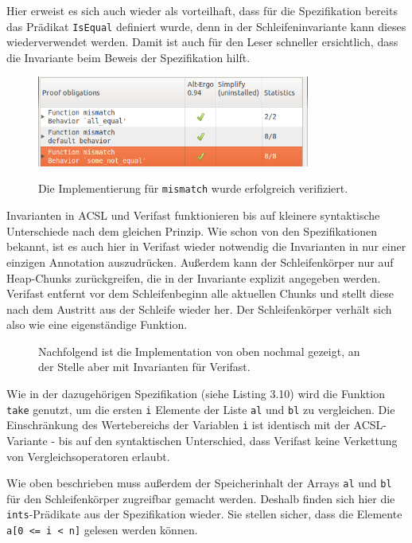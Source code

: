 Hier erweist es sich auch wieder als vorteilhaft, dass für die Spezifikation bereits das Prädikat
\lstinline{IsEqual} definiert wurde, denn in der Schleifeninvariante kann dieses wiederverwendet werden. Damit
ist auch für den Leser schneller ersichtlich, dass die Invariante beim Beweis der Spezifikation hilft.

\begin{figure}[H]
	\centering
\includegraphics[width=0.8\textwidth]{images/acsl-prove-mismatch.png}

Die Implementierung für \lstinline{mismatch} wurde erfolgreich verifiziert.
\end{figure}

Invarianten in ACSL und Verifast funktionieren bis auf kleinere syntaktische Unterschiede nach dem gleichen Prinzip.
Wie schon von den Spezifikationen bekannt, ist es auch hier in Verifast wieder notwendig die Invarianten in nur
einer einzigen Annotation auszudrücken. Außerdem kann der Schleifenkörper nur auf Heap-Chunks zurückgreifen, die
in der Invariante explizit angegeben werden. Verifast entfernt vor dem Schleifenbeginn alle aktuellen Chunks
und stellt diese nach dem Austritt aus der Schleife wieder her. Der Schleifenkörper verhält sich also
wie eine eigenständige Funktion.

\begin{figure}[H]
Nachfolgend ist die Implementation von oben nochmal gezeigt, an der Stelle aber mit Invarianten für Verifast.


\end{figure} 

Wie in der dazugehörigen Spezifikation (siehe Listing 3.10) wird die Funktion \lstinline{take} genutzt,
um die ersten \lstinline{i} Elemente der Liste \lstinline{al} und \lstinline{bl} zu vergleichen.
Die Einschränkung des Wertebereichs der Variablen \lstinline{i} ist identisch mit der ACSL-Variante -
bis auf den syntaktischen Unterschied, dass Verifast keine Verkettung von Vergleichsoperatoren erlaubt.

Wie oben beschrieben muss außerdem der Speicherinhalt der Arrays \lstinline{al} und \lstinline{bl} für
den Schleifenkörper zugreifbar gemacht werden. Deshalb finden sich hier die \lstinline{ints}-Prädikate
aus der Spezifikation wieder. Sie stellen sicher, dass die Elemente \lstinline{a[0 <= i < n]} gelesen
werden können.

